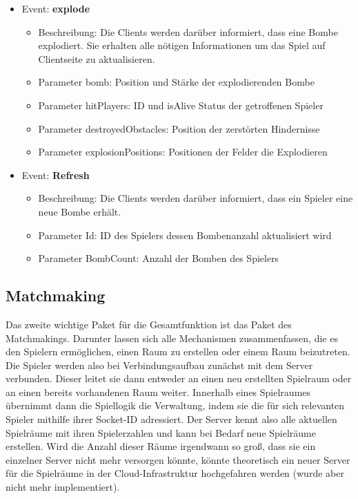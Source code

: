 \documentclass[conference]{IEEEtran}
\begin{document}
\begin{itemize}
\begin{itemize}
\end{itemize}

\item Event: \textbf{explode}
\begin{itemize}
\item Beschreibung:
    Die Clients werden darüber informiert, dass eine Bombe explodiert. Sie erhalten alle nötigen Informationen um das Spiel auf Clientseite zu aktualisieren.
    
\item Parameter \glqq bomb\grqq{}: Position und Stärke der explodierenden Bombe
\item Parameter \glqq hitPlayers\grqq{}: ID und isAlive Status der getroffenen Spieler
\item Parameter \glqq destroyedObstacles\grqq{}: Position der zerstörten Hindernisse
\item Parameter \glqq explosionPositions\grqq{}: 
Positionen der Felder die Explodieren
\end{itemize}

\item Event: \textbf{Refresh}
\begin{itemize}
\item Beschreibung:
    Die Clients werden darüber informiert, dass ein Spieler eine neue Bombe erhält.
    
\item Parameter \glqq Id\grqq{}: ID des Spielers dessen Bombenanzahl aktualisiert wird
\item Parameter \glqq BombCount\grqq{}: Anzahl der Bomben des Spielers
\end{itemize}

\end{itemize}
\smallskip

\subsection{Matchmaking}
Das zweite wichtige Paket für die Gesamtfunktion ist das Paket des Matchmakings. Darunter lassen sich alle Mechanismen zusammenfassen, die es den Spielern ermöglichen, einen Raum zu erstellen oder einem Raum beizutreten. Die Spieler werden also bei Verbindungsaufbau zunächst mit dem Server verbunden. Dieser leitet sie dann entweder an einen neu erstellten Spielraum oder an einen bereits vorhandenen Raum weiter. Innerhalb eines Spielraumes übernimmt dann die Spiellogik die Verwaltung, indem sie die für sich relevanten Spieler mithilfe ihrer Socket-ID adressiert. Der Server kennt also alle aktuellen Spielräume mit ihren Spielerzahlen und kann bei Bedarf neue Spielräume erstellen. Wird die Anzahl dieser Räume irgendwann so groß, dass sie ein einzelner Server nicht mehr versorgen könnte, könnte theoretisch ein neuer Server für die Spielräume in der Cloud-Infrastruktur hochgefahren werden (wurde aber nicht mehr implementiert).
\end{document}
